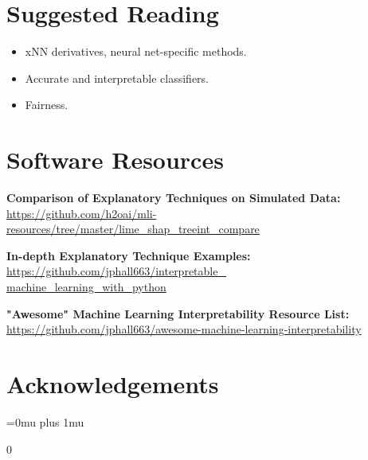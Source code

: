 \documentclass{article}
\begin{document}
\section{Suggested Reading} \label{sec:suggested}

\begin{itemize}
\item xNN derivatives, neural net-specific methods.
\item Accurate and interpretable classifiers.
\item Fairness.
\end{itemize} 

\section{Software Resources} \label{sec:software}

\sloppy

\textbf{Comparison of Explanatory Techniques on Simulated Data:}\\
\href{https://github.com/h2oai/mli-resources/tree/master/lime_shap_treeint_compare}{https://github.com/h2oai/mli-resources/tree/master/lime\_shap\_treeint\_compare}\\

\vspace{10pt}

\textbf{In-depth Explanatory Technique Examples:}\\
\href{https://github.com/jphall663/interpretable_machine_learning_with_python}{https://github.com/jphall663/interpretable\_\\machine\_learning\_with\_python}\\

\vspace{10pt}

\textbf{"Awesome" Machine Learning Interpretability Resource List:}\\
\href{https://github.com/jphall663/awesome-machine-learning-interpretability}{https://github.com/jphall663/awesome-machine-learning-interpretability}

\fussy

\section{Acknowledgements} 



\Urlmuskip=0mu plus 1mu\relax



0
\end{document}
